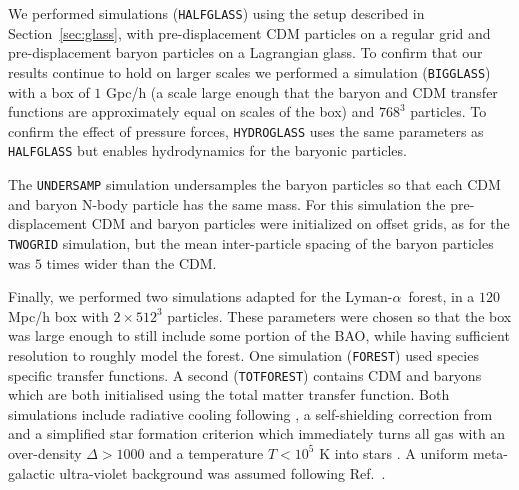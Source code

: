 \documentclass[a4paper,11pt]{article}
\newcommand{\Lya}{Lyman-$\alpha$}
\begin{document}
We performed simulations (\texttt{HALFGLASS}) using the setup described in Section~\ref{sec:glass}, with pre-displacement CDM particles on a regular grid and pre-displacement baryon particles on a Lagrangian glass. To confirm that our results continue to hold on larger scales we performed a simulation (\texttt{BIGGLASS}) with a box of $1$ Gpc/h (a scale large enough that the baryon and CDM transfer functions are approximately equal on scales of the box) and $768^3$ particles. To confirm the effect of pressure forces, \texttt{HYDROGLASS} uses the same parameters as \texttt{HALFGLASS} but enables hydrodynamics for the baryonic particles.

The \texttt{UNDERSAMP} simulation undersamples the baryon particles so that each CDM and baryon N-body particle has the same mass. For this simulation the pre-displacement CDM and baryon particles were initialized on offset grids, as for the \texttt{TWOGRID} simulation, but the mean inter-particle spacing of the baryon particles was $5$ times wider than the CDM.

Finally, we performed two simulations adapted for the \Lya~forest, in a $120$ Mpc/h box with $2\times 512^3$ particles. These parameters were chosen so that the box was large enough to still include some portion of the BAO, while having sufficient resolution to roughly model the forest. One simulation (\texttt{FOREST}) used species specific transfer functions. A second (\texttt{TOTFOREST}) contains CDM and baryons which are both initialised using the total matter transfer function. Both simulations include radiative cooling following \cite{Katz:1996}, a self-shielding correction from \cite{Rahmati:2013} and a simplified star formation criterion which immediately turns all gas with an over-density $\Delta > 1000$ and a temperature $T < 10^5$ K into stars \cite{Viel:2004}. A uniform meta-galactic ultra-violet background was assumed following Ref.~\cite{Puchwein:2018}.
\end{document}

